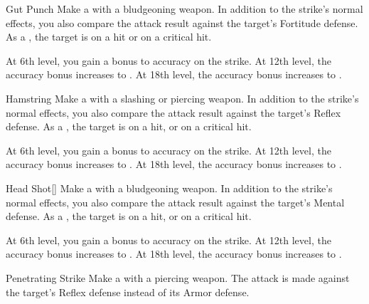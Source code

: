 {            \begin{ability}{Gut Punch}
                Make a  with a bludgeoning weapon.
                In addition to the strike's normal effects, you also compare the attack result against the target's Fortitude defense.
                As a , the target is \sickened on a hit or \nauseated on a critical hit.

                At 6th level, you gain a  bonus to accuracy on the strike.
                At 12th level, the accuracy bonus increases to .
                At 18th level, the accuracy bonus increases to .
            \end{ability}

            \begin{ability}{Hamstring}
                Make a  with a slashing or piercing weapon.
                In addition to the strike's normal effects, you also compare the attack result against the target's Reflex defense.
                As a , the target is \slowed on a hit, or \immobilized on a critical hit.

                At 6th level, you gain a  bonus to accuracy on the strike.
                At 12th level, the accuracy bonus increases to .
                At 18th level, the accuracy bonus increases to .
            \end{ability}

            \begin{ability}{Head Shot}[]
                Make a  with a bludgeoning weapon.
                In addition to the strike's normal effects, you also compare the attack result against the target's Mental defense.
                As a , the target is \dazed on a hit, or \stunned on a critical hit.

                At 6th level, you gain a  bonus to accuracy on the strike.
                At 12th level, the accuracy bonus increases to .
                At 18th level, the accuracy bonus increases to .
            \end{ability}

            \begin{ability}{Penetrating Strike}
                Make a  with a piercing weapon.
                The attack is made against the target's Reflex defense instead of its Armor defense.


\end{ability}}
